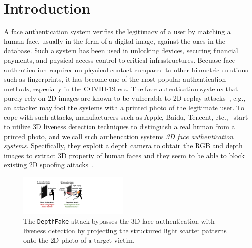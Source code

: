 \section{Introduction}
A face authentication system verifies the legitimacy of a user by matching a human face, usually in the form of a digital image, against the ones in the database. Such a system has been used in unlocking devices, securing financial payments, and physical access control to critical infrastructures. Becuase face authentication requires no physical contact compared to other biometric solutions such as fingerprints, it has become one of the most popular authentication methods, especially in the COVID-19 era. The face autentication systems that purely rely on 2D images are known to be vulnerable to 2D replay attacks~\cite{chakka2011competition,anjos2011counter,raghavendra2015presentation}, e.g., an attacker may fool the systems with a printed photo of the legitimate user.
To cope with such attacks, manufacturers such as Apple, Baidu, Tencent, etc.,~\cite{faceid, baidu, tencent} start to utilize 3D liveness detection techniques to distinguish a real human from a printed photo, and we call such authencation systems \textit{3D face authentication systems}. Specifically, they exploit a depth camera to obtain the RGB and depth images to extract 3D property of human faces and they seem to be able to block existing 2D spoofing attacks~\cite{souza2018far, marcel2014handbook}.




\begin{figure}[t]
	\centerline{\includegraphics[width = 0.48\textwidth]{figures/intro.pdf}}
	\vspace{-0.1in}
	\caption{The \texttt{DepthFake} attack bypasses the 3D face authentication with liveness detection by projecting the structured light scatter patterns onto the 2D photo of a target victim.}
	\label{intro}
	\vspace{-0.2in}
\end{figure}

